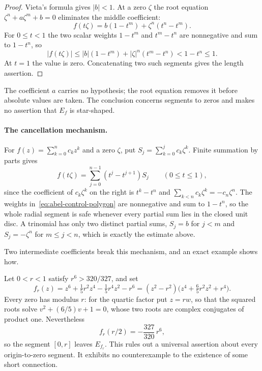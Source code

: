 \begin{proof}
Vieta's formula gives $|b|<1$.  At a zero $\zeta$ the root equation
$\zeta^n+a\zeta^m+b=0$ eliminates the middle coefficient:
\begin{equation}\label{eq:trinomial-cancellation}
 f(t\zeta)=b(1-t^m)+\zeta^n(t^n-t^m).
\end{equation}
For $0\le t<1$ the two scalar weights $1-t^m$ and $t^m-t^n$ are nonnegative
and sum to $1-t^n$, so
\[
 |f(t\zeta)|\le|b|(1-t^m)+|\zeta|^n(t^m-t^n)<1-t^n\le1 .
\]
At $t=1$ the value is zero.  Concatenating two such segments gives the length
assertion.
\end{proof}

The coefficient $a$ carries no hypothesis; the root equation removes it before
absolute values are taken.  The conclusion concerns segments to zeros and
makes no assertion that $E_f$ is star-shaped.

\paragraph{The cancellation mechanism.}
\label{subsec:abel-mechanism}
For $f(z)=\sum_{k=0}^nc_kz^k$ and a zero $\zeta$, put
$S_j=\sum_{k=0}^jc_k\zeta^k$.  Finite summation by parts gives
\begin{equation}\label{eq:abel-control-polygon}
 f(t\zeta)=\sum_{j=0}^{n-1}(t^j-t^{j+1})S_j\qquad(0\le t\le1),
\end{equation}
since the coefficient of $c_k\zeta^k$ on the right is $t^k-t^n$ and
$\sum_{k<n}c_k\zeta^k=-c_n\zeta^n$.  The weights
in~\eqref{eq:abel-control-polygon} are nonnegative and sum to $1-t^n$, so the
whole radial segment is safe whenever every partial sum lies in the closed
unit disc.  A trinomial has only two distinct partial sums, $S_j=b$ for $j<m$
and $S_j=-\zeta^n$ for $m\le j<n$, which is exactly the estimate above.

Two intermediate coefficients break this mechanism, and an exact example shows
how.

\begin{example}\label{ex:sextic-spoke}
Let $0<r<1$ satisfy $r^6>320/327$, and set
\[
 f_r(z)=z^6+\tfrac15r^2z^4-\tfrac15r^4z^2-r^6
       =(z^2-r^2)\bigl(z^4+\tfrac65r^2z^2+r^4\bigr).
\]
Every zero has modulus $r$: for the quartic factor put $z=rw$, so that the
squared roots solve $v^2+(6/5)v+1=0$, whose two roots are complex conjugates
of product one.  Nevertheless
\[
 f_r(r/2)=-\frac{327}{320}\,r^6,
\]
so the segment $[0,r]$ leaves $E_{f_r}$.  This rules out a universal assertion
about every origin-to-zero segment.  It exhibits no counterexample to the
existence of some short connection.
\end{example}


